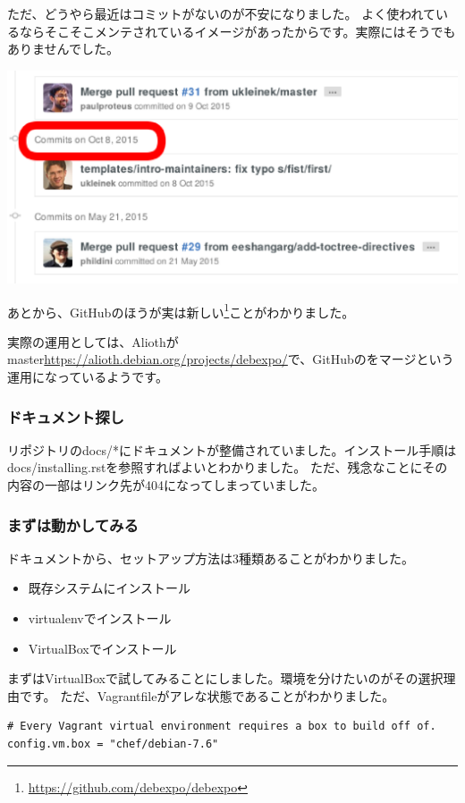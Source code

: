 \documentclass[mingoth,a4paper]{jsarticle}
\begin{document}
ただ、どうやら最近はコミットがないのが不安になりました。
よく使われているならそこそこメンテされているイメージがあったからです。実際にはそうでもありませんでした。

\begin{screen}
\includegraphics[width=0.7\hsize]{image201606/last-change-on-github.eps}
\end{screen}

あとから、GitHubのほうが実は新しい\footnote{\url{https://github.com/debexpo/debexpo}}ことがわかりました。

実際の運用としては、Aliothがmaster\url{https://alioth.debian.org/projects/debexpo/}で、GitHubのをマージという運用になっているようです。

\subsubsection{ドキュメント探し}

リポジトリのdocs/*にドキュメントが整備されていました。インストール手順はdocs/installing.rstを参照すればよいとわかりました。
ただ、残念なことにその内容の一部はリンク先が404になってしまっていました。

\subsubsection{まずは動かしてみる}

ドキュメントから、セットアップ方法は3種類あることがわかりました。

\begin{itemize}
  \item 既存システムにインストール
  \item virtualenvでインストール
  \item VirtualBoxでインストール
\end{itemize}

まずはVirtualBoxで試してみることにしました。環境を分けたいのがその選択理由です。
ただ、Vagrantfileがアレな状態であることがわかりました。

\begin{screen}
\begin{verbatim}
# Every Vagrant virtual environment requires a box to build off of.
config.vm.box = "chef/debian-7.6"
\end{verbatim}
\end{screen}
\end{document}
